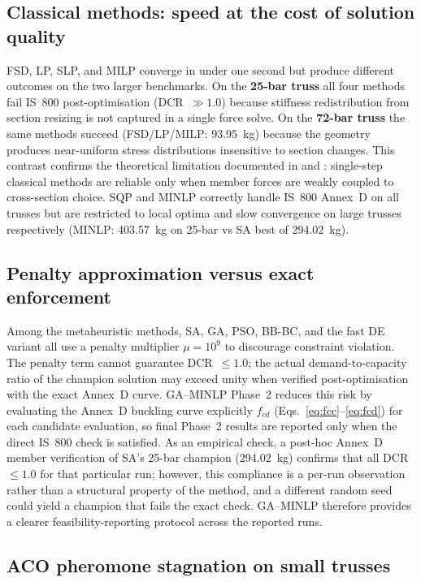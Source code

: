 \documentclass[lineno,pdflatex,sn-mathphys-num]{sn-jnl}
\begin{document}
\subsection{Classical methods: speed at the cost of solution quality}

FSD, LP, SLP, and MILP converge in under one second but produce
different outcomes on the two larger benchmarks.
On the \textbf{25-bar truss} all four methods fail IS~800
post-optimisation (DCR~$\gg 1.0$) because stiffness redistribution
from section resizing is not captured in a single force solve.
On the \textbf{72-bar truss} the same methods succeed
(FSD/LP/MILP: 93.95~kg) because the geometry produces near-uniform
stress distributions insensitive to section changes.
This contrast confirms the theoretical limitation documented in
\citet{Gallagher1973} and \citet{Ringertz1988}: single-step classical
methods are reliable only when member forces are weakly coupled to
cross-section choice.
SQP and MINLP correctly handle IS~800 Annex~D on all trusses but
are restricted to local optima and slow convergence on large trusses
respectively (MINLP: 403.57~kg on 25-bar vs SA best of 294.02~kg).

\subsection{Penalty approximation versus exact enforcement}

Among the metaheuristic methods, SA, GA, PSO, BB-BC, and the fast DE
variant all use a penalty multiplier $\mu=10^9$ to discourage constraint
violation.
The penalty term cannot guarantee DCR~$\leq 1.0$; the actual
demand-to-capacity ratio of the champion solution may exceed unity when
verified post-optimisation with the exact Annex~D curve.
GA--MINLP Phase~2 reduces this risk by evaluating the Annex~D buckling
curve explicitly $f_{cd}$ (Eqs.~\ref{eq:fcc}--\ref{eq:fcd}) for each candidate evaluation,
so final Phase~2 results are reported only when the direct IS~800 check is satisfied.
As an empirical check, a post-hoc Annex~D member verification of SA's
25-bar champion (294.02~kg) confirms that all DCR~$\leq 1.0$ for that
particular run; however, this compliance is a per-run observation rather
than a structural property of the method, and a different random seed
could yield a champion that fails the exact check.
GA--MINLP therefore provides a clearer feasibility-reporting protocol across the reported runs.

\subsection{ACO pheromone stagnation on small trusses}
\label{sec:aco}
\end{document}
